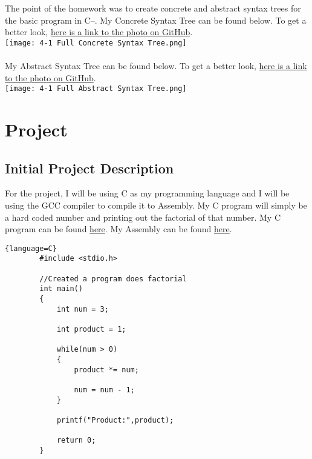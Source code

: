 \documentclass{article}
\theoremstyle{theorem}
\theoremstyle{definition}
\theoremstyle{remark}
\begin{document}
The point of the homework was to create concrete and abstract syntax trees for the basic program in C--. 
My Concrete Syntax Tree can be found below. To get a better look, \href{https://github.com/mamba72/CompilerConstruction_Assignments/blob/main/Reports/ReportResources/4-1\%20Full\%20Concrete\%20Syntax\%20Tree.png}{here is a link to the photo on GitHub}.\\
\texttt{[image: 4-1 Full Concrete Syntax Tree.png]}\\
\\
My Abstract Syntax Tree can be found below. To get a better look, \href{https://github.com/mamba72/CompilerConstruction_Assignments/blob/main/Reports/ReportResources/4-1\%20Full\%20Abstract\%20Syntax\%20Tree.png}{here is a link to the photo on GitHub}.\\
\texttt{[image: 4-1 Full Abstract Syntax Tree.png]}\\

\section{Project}

\subsection{Initial Project Description}
For the project, I will be using C as my programming language and I will be using the GCC compiler to compile it to Assembly. My C program will simply be a hard coded number and printing out the factorial of that number. My C program can be found \href{https://github.com/mamba72/CompilerConstruction_Assignments/blob/main/ExplainingACompiler/CProgram.c}{here}. My Assembly can be found \href{https://github.com/mamba72/CompilerConstruction_Assignments/blob/main/ExplainingACompiler/CProgram.out}{here}.

\begin{lstlisting}{language=C}
        #include <stdio.h>

        //Created a program does factorial
        int main()
        {
            int num = 3;
        
            int product = 1;
        
            while(num > 0)
            {
                product *= num;
        
                num = num - 1;
            }
        
            printf("Product:",product);
        
            return 0;
        }
\end{lstlisting}
\end{document}
